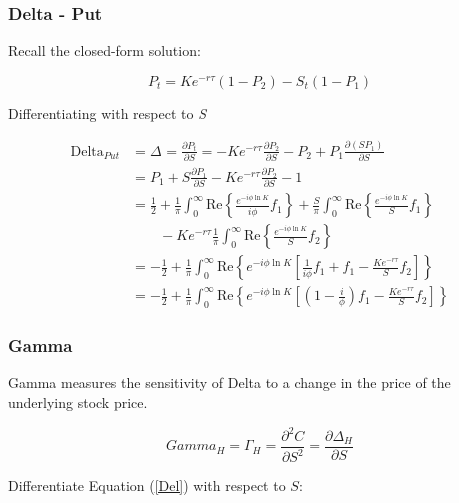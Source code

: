 \documentclass[a4paper]{article}
\begin{document}
\newpage



\subsubsection*{Delta - Put}

Recall the closed-form solution:

\begin{equation}
	P_t = Ke^{-r\tau}(1-P_2) -  S_t(1-P_1)
	\label{eq:Heston_C}
\end{equation}

Differentiating with respect to \textit{S}

\begin{align*}
	\mbox{Delta}_{Put} 
	& = \Delta_{} = \frac{\partial P_t}{\partial S} = 
	- Ke^{-r\tau}\frac{\partial P_2}{\partial S} 
	- P_2 
	+ P_1\frac{\partial (SP_1)}{\partial S} \\
	& 
	= P_1 
	+ S \frac{\partial P_1}{\partial S} 
	- Ke^{-r\tau}\frac{\partial P_2}{\partial S} 
	- 1 \\
	& = \frac{1}{2}
	+ \frac{1}{\pi} \int_0^\infty \mbox{Re}\left\{\frac{e^{-i \phi \ln K}}{i\phi}f_1 \right\} 
	+ \frac{S}{\pi} \int_0^\infty \mbox{Re}\left\{\frac{e^{-i \phi \ln K}}{S}f_1 \right\} \\
	& \quad \quad - Ke^{-r\tau} \frac{1}{\pi} \int_0^\infty \mbox{Re}\left\{\frac{e^{-i \phi \ln K}}{S}f_2 \right\} \\
	&
	= -\frac{1}{2} 
	+ \frac{1}{\pi} \int_0^\infty \mbox{Re}\left\{e^{-i \phi \ln K} \left[\frac{1}{i \phi}f_1 + f_1 - \frac{Ke^{-r\tau}}{S}f_2 \right] \right\} \\
	& 
	= -\frac{1}{2} 
	+ \frac{1}{\pi} \int_0^\infty \mbox{Re}\left\{e^{-i \phi \ln K} \left[\left(1-\frac{i}{\phi} \right)f_1 - \frac{Ke^{-r\tau}}{S}f_2 \right] \right\}
\end{align*}




\subsubsection*{Gamma}

Gamma measures the sensitivity of Delta to a change in the price of the underlying stock price.

\[Gamma_H = \Gamma_H  = \frac{\partial^2C}{\partial S^2} =\frac{\partial \Delta_H}{\partial S} \]

Differentiate Equation (\ref{Del}) with respect to $S$:
\end{document}
